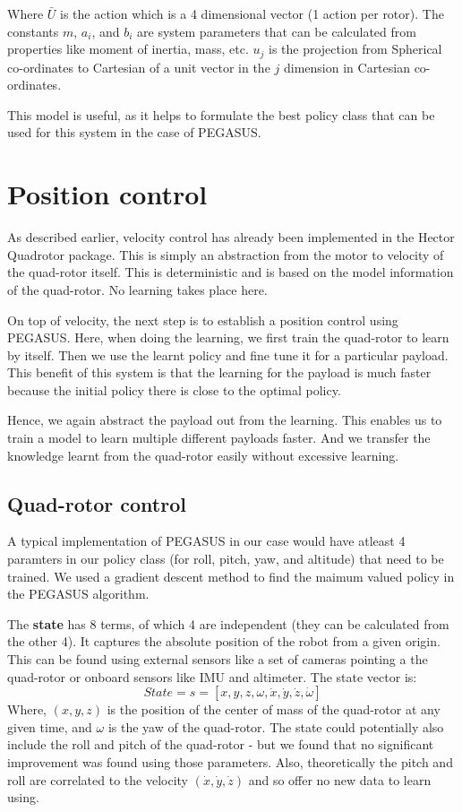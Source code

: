 \documentclass[hidelinks,BTech]{iitmdiss}
\begin{document}
Where $\bar{U}$ is the action which is a 4 dimensional vector (1 action per rotor). The constants $m$, $a_{i}$, and $b_{i}$ are system parameters that can be calculated from properties like moment of inertia, mass, etc. $u_{j}$ is the projection from Spherical co-ordinates to Cartesian of a unit vector in the $j$ dimension in Cartesian co-ordinates.

This model is useful, as it helps to formulate the best policy class that can be used for this system in the case of PEGASUS.

\chapter{Position control}

As described earlier, velocity control has already been implemented in the Hector Quadrotor package. This is simply an abstraction from the motor to velocity of the quad-rotor itself. This is deterministic and is based on the model information of the quad-rotor. No learning takes place here.

On top of velocity, the next step is to establish a position control using PEGASUS. Here, when doing the learning, we first train the quad-rotor to learn by itself. Then we use the learnt policy and fine tune it for a particular payload. This benefit of this system is that the learning for the payload is much faster because the initial policy there is close to the optimal policy.

Hence, we again abstract the payload out from the learning. This enables us to train a model to learn multiple different payloads faster. And we transfer the knowledge learnt from the quad-rotor easily without excessive learning.

\section{Quad-rotor control}

A typical implementation of PEGASUS in our case would have atleast 4 paramters in our policy class (for roll, pitch, yaw, and altitude) that need to be trained. We used a gradient descent method to find the maimum valued policy in the PEGASUS algorithm.

The {\bf state} has 8 terms, of which 4 are independent (they can be calculated from the other 4). It captures the absolute position of the robot from a given origin. This can be found using external sensors like a set of cameras pointing a the quad-rotor or onboard sensors like IMU and altimeter. The state vector is:
\begin{equation}
  State = s = [x, y, z, \omega, \dot{x}, \dot{y}, \dot{z}, \dot{\omega}]
\end{equation}
Where, $(x, y, z)$ is the position of the center of mass of the quad-rotor at any given time, and $\omega$ is the yaw of the quad-rotor. The state could potentially also include the roll and pitch of the quad-rotor - but we found that no significant improvement was found using those parameters. Also, theoretically the pitch and roll are correlated to the velocity $(\dot{x}, \dot{y}, \dot{z})$ and so offer no new data to learn using.
\end{document}
